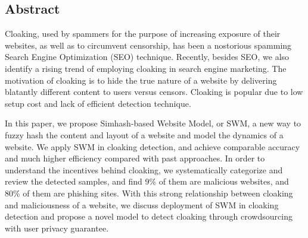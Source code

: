 
\subsection*{Abstract}
Cloaking, used by spammers for the purpose of increasing exposure of
their websites, as well as to circumvent censorship, has been a nostorious
spamming Search Engine Optimization (SEO) technique. Recently, besides SEO, we also
identify a rising trend of employing cloaking in search engine marketing. The motivation of cloaking 
is to hide the true nature of a website by delivering blatantly different 
content to users versus censors. Cloaking is popular due to low setup cost 
and lack of efficient detection technique. 

In this paper, we propose Simhash-based Website Model, or SWM, a new way to
fuzzy hash the content and layout of a
website and model the dynamics of a website. 
We apply SWM in cloaking detection, and achieve comparable accuracy and much
higher efficiency
compared with past approaches. In order to understand the incentives
behind cloaking, we systematically
categorize and review the detected samples, and find 9\% of them are malicious
websites, and 80\% of them are phishing sites. 
With this strong relationship between cloaking and maliciousness of a website,
we discuss deployment of SWM in cloaking detection and
propose a novel model to
detect cloaking through crowdsourcing with user privacy guarantee.

